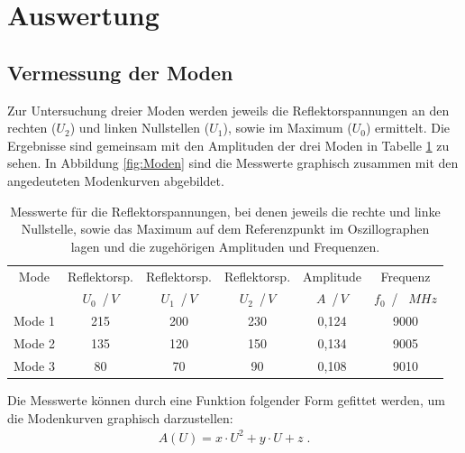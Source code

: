 \section{Auswertung}

\subsection{Vermessung der Moden}
Zur Untersuchung dreier Moden werden jeweils die Reflektorspannungen an den rechten ($U_2$)
und linken Nullstellen ($U_1$), sowie im Maximum ($U_0$) ermittelt.
Die Ergebnisse sind gemeinsam mit den Amplituden der drei Moden in Tabelle
\ref{tab:Moden} zu sehen. In Abbildung \ref{fig:Moden} sind die Messwerte graphisch
zusammen mit den angedeuteten Modenkurven abgebildet.
\FloatBarrier
\begin{table}
    \centering
    \begin{tabular}{c c c c c c}
        \toprule
        {Mode} & {Reflektorsp.} & {Reflektorsp.} & {Reflektorsp.} & {Amplitude} & {Frequenz} \\
        {}     & {$U_0$ \,/\,$\si{V}$} & {$U_1$ \,/\,$\si{V}$} & {$U_2$ \,/\,$\si{V}$} & {$A$ \,/\,$\si{V}$ } & {$f_0$\, / \, $\si{MHz}$} \\
        \midrule
        Mode 1  &  215  &  200  &  230  &  0,124  &  9000     \\
        Mode 2  &  135  &  120  &  150  &  0,134  &  9005     \\
        Mode 3  &   80  &   70  &   90  &  0,108  &  9010     \\
        \bottomrule
    \end{tabular}
    \caption{Messwerte für die Reflektorspannungen, bei denen jeweils die rechte und linke Nullstelle, sowie das Maximum
    auf dem Referenzpunkt im Oszillographen lagen und die zugehörigen Amplituden und Frequenzen.}
    \label{tab:Moden}
\end{table}
\FloatBarrier

\noindent Die Messwerte können durch eine Funktion folgender Form gefittet werden, um die
Modenkurven graphisch darzustellen:
\begin{align*}
    A(U) = x \cdot U^2 + y \cdot U + z \; .
\end{align*}

